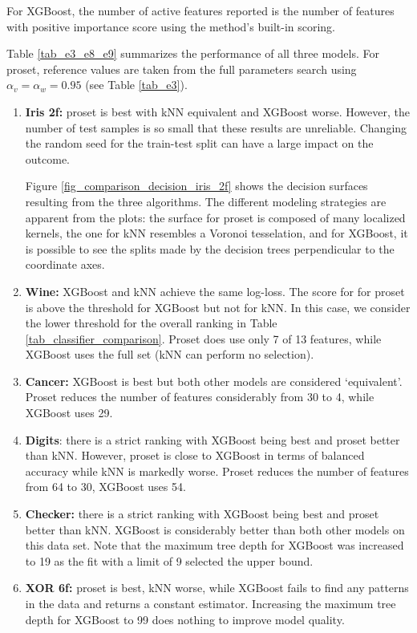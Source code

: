 For XGBoost, the number of active features reported is the number of features with positive importance score using the method's built-in scoring.\par
%
Table \ref{tab_e3_e8_e9} summarizes the performance of all three models.
For proset, reference values are taken from the full parameters search using $\alpha_v=\alpha_w=0.95$ (see Table \ref{tab_e3}).\par
%
\begin{enumerate}
\item\textbf{Iris 2f:} proset is best with kNN equivalent and XGBoost worse.
However, the number of test samples is so small that these results are unreliable.
Changing the random seed for the train-test split can have a large impact on the outcome.\par
%
Figure \ref{fig_comparison_decision_iris_2f} shows the decision surfaces resulting from the three algorithms.
The different modeling strategies are apparent from the plots: the surface for proset is composed of many localized kernels, the one for kNN resembles a Voronoi tesselation, and for XGBoost, it is possible to see the splits made by the decision trees perpendicular to the coordinate axes.
%
\item\textbf{Wine:} XGBoost and kNN achieve the same log-loss.
The score for for proset is above the threshold for XGBoost but not for kNN.
In this case, we consider the lower threshold for the overall ranking in Table \ref{tab_classifier_comparison}.
Proset does use only 7 of 13 features, while XGBoost uses the full set (kNN can perform no selection).
%
\item\textbf{Cancer:} XGBoost is best but both other models are considered `equivalent'.
Proset reduces the number of features considerably from 30 to 4, while XGBoost uses 29.
%
\item\textbf{Digits}: there is a strict ranking with XGBoost being best and proset better than kNN.
However, proset is close to XGBoost in terms of balanced accuracy while kNN is markedly worse.
Proset reduces the number of features from 64 to 30, XGBoost uses 54.
%
\item\textbf{Checker:} there is a strict ranking with XGBoost being best and proset better than kNN.
XGBoost is considerably better than both other models on this data set.
Note that the maximum tree depth for XGBoost was increased to 19 as the fit with a limit of 9 selected the upper bound.
%
\item\textbf{XOR 6f:} proset is best, kNN worse, while XGBoost fails to find any patterns in the data and returns a constant estimator.
Increasing the maximum tree depth for XGBoost to 99 does nothing to improve model quality.
\end{enumerate}
